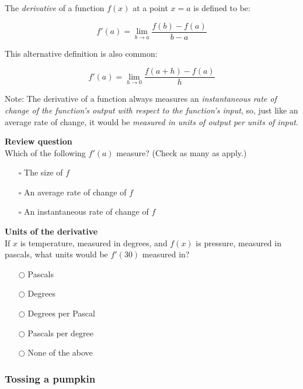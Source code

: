 \documentclass[pdftex, brazil, 12pt, twoside]{article}
\begin{document}
The \emph{derivative} of a function $f(x)$ at a point $x=a$ is defined to be:

\begin{equation}
  f'(a) = \lim_{b \to a}\frac{f(b) - f(a)}{b - a}
\end{equation}

This alternative definition is also common:

\begin{equation}
  f'(a) = \lim_{h \to 0}\frac{f(a + h) - f(a)}{h}
\end{equation}

Note: The derivative of a function always measures an \emph{instantaneous rate of change
of the function's output with respect to the function's input}, so, just like an
average rate of change, it would be \emph{measured in units of output per units of input}.

\begin{exercise}
  \textbf{Review question}\\%
  Which of the following $f'(a)$ measure?
  (Check as many as apply.)
\begin{itemize}[noitemsep]
\item[$\square$] The size of $f$
\item[$\square$] An average rate of change of $f$
\item[$\square$] An instantaneous rate of change of $f$
\end{itemize}
\end{exercise}

\begin{exercise}
  \textbf{Units of the derivative}\\%
  If $x$ is temperature, measured in
  degrees, and $f(x)$ is pressure, measured in pascals, what units would
  be $f'(30)$ measured in? 
\begin{itemize}[noitemsep]
\item[$\bigcirc$] Pascals
\item[$\bigcirc$] Degrees
\item[$\bigcirc$] Degrees per Pascal
\item[$\bigcirc$] Pascals per degree
\item[$\bigcirc$] None of the above 
\end{itemize}
\end{exercise}

\subsubsection{Tossing a pumpkin}
\label{u1-what-pumpkin}
\end{document}
